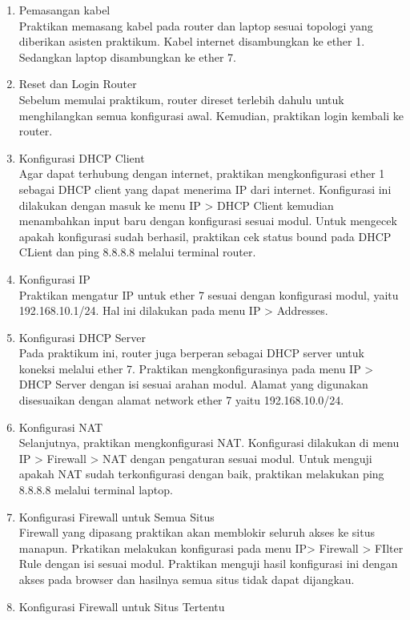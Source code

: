 \begin{enumerate}
  \item Pemasangan kabel \\
  Praktikan memasang kabel pada router dan laptop sesuai topologi yang diberikan asisten praktikum. Kabel internet disambungkan ke ether 1. Sedangkan laptop disambungkan ke ether 7.
  \item Reset dan Login Router \\
  Sebelum memulai praktikum, router direset terlebih dahulu untuk menghilangkan semua konfigurasi awal. Kemudian, praktikan login kembali ke router.
  \item Konfigurasi DHCP Client \\
  Agar dapat terhubung dengan internet, praktikan mengkonfigurasi ether 1 sebagai DHCP client yang dapat menerima IP dari internet. Konfigurasi ini dilakukan dengan masuk ke menu IP > DHCP Client kemudian menambahkan input baru dengan konfigurasi sesuai modul. Untuk mengecek apakah konfigurasi sudah berhasil, praktikan cek status bound pada DHCP CLient dan ping 8.8.8.8 melalui terminal router.
  \item Konfigurasi IP \\
  Praktikan mengatur IP untuk ether 7 sesuai dengan konfigurasi modul, yaitu 192.168.10.1/24. Hal ini dilakukan pada menu IP > Addresses.
  \item Konfigurasi DHCP Server \\
  Pada praktikum ini, router juga berperan sebagai DHCP server untuk koneksi melalui ether 7. Praktikan mengkonfigurasinya pada menu IP > DHCP Server dengan isi sesuai arahan modul. Alamat yang digunakan disesuaikan dengan alamat network ether 7 yaitu 192.168.10.0/24.
  \item Konfigurasi NAT \\
  Selanjutnya, praktikan mengkonfigurasi NAT. Konfigurasi dilakukan di menu IP > Firewall > NAT dengan pengaturan sesuai modul. Untuk menguji apakah NAT sudah terkonfigurasi dengan baik, praktikan melakukan ping 8.8.8.8 melalui terminal laptop.
  \item Konfigurasi Firewall untuk Semua Situs\\
  Firewall yang dipasang praktikan akan memblokir seluruh akses ke situs manapun. Prkatikan melakukan konfigurasi pada menu IP> Firewall > FIlter Rule dengan isi sesuai modul. Praktikan menguji hasil konfigurasi ini dengan akses pada browser dan hasilnya semua situs tidak dapat dijangkau.
  \item Konfigurasi Firewall untuk Situs Tertentu\\

\end{enumerate}
